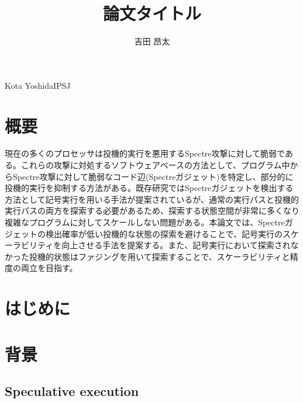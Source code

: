 \documentclass[submit]{ipsj}
\begin{document}
\title{論文タイトル}

\author{吉田 昂太}{Kota Yoshida}{IPSJ}



\maketitle

\section{概要}
現在の多くのプロセッサは投機的実行を悪用するSpectre攻撃に対して脆弱である。これらの攻撃に対処するソフトウェアベースの方法として、プログラム中からSpectre攻撃に対して脆弱なコード辺(Spectreガジェット)を特定し、部分的に投機的実行を抑制する方法がある。既存研究ではSpectreガジェットを検出する方法として記号実行を用いる手法が提案されているが、通常の実行パスと投機的実行パスの両方を探索する必要があるため、探索する状態空間が非常に多くなり複雑なプログラムに対してスケールしない問題がある。本論文では、Spectreガジェットの検出確率が低い投機的な状態の探索を避けることで、記号実行のスケーラビリティを向上させる手法を提案する。また、記号実行において探索されなかった投機的状態はファジングを用いて探索することで、スケーラビリティと精度の両立を目指す。

\section{はじめに}

\section{背景}
\subsection{Speculative execution}
\end{document}

